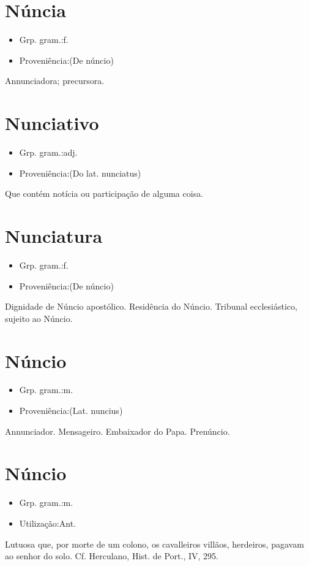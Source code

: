 \section{Núncia}
\begin{itemize}
\item {Grp. gram.:f.}
\end{itemize}
\begin{itemize}
\item {Proveniência:(De \textunderscore núncio\textunderscore )}
\end{itemize}
Annunciadora; precursora.
\section{Nunciativo}
\begin{itemize}
\item {Grp. gram.:adj.}
\end{itemize}
\begin{itemize}
\item {Proveniência:(Do lat. \textunderscore nunciatus\textunderscore )}
\end{itemize}
Que contém notícia ou participação de alguma coisa.
\section{Nunciatura}
\begin{itemize}
\item {Grp. gram.:f.}
\end{itemize}
\begin{itemize}
\item {Proveniência:(De \textunderscore núncio\textunderscore )}
\end{itemize}
Dignidade de Núncio apostólico.
Residência do Núncio.
Tribunal ecclesiástico, sujeito ao Núncio.
\section{Núncio}
\begin{itemize}
\item {Grp. gram.:m.}
\end{itemize}
\begin{itemize}
\item {Proveniência:(Lat. \textunderscore nuncius\textunderscore )}
\end{itemize}
Annunciador.
Mensageiro.
Embaixador do Papa.
Prenúncio.
\section{Núncio}
\begin{itemize}
\item {Grp. gram.:m.}
\end{itemize}
\begin{itemize}
\item {Utilização:Ant.}
\end{itemize}
Lutuosa que, por morte de um colono, os cavalleiros villãos, herdeiros, pagavam ao senhor do solo. Cf. Herculano, \textunderscore Hist. de Port.\textunderscore , IV, 295.
